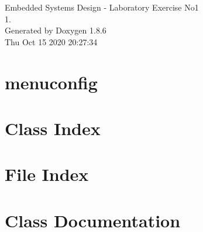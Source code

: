 \documentclass[twoside]{book}
\newcommand{\clearemptydoublepage}{%
  \newpage{\pagestyle{empty}\cleardoublepage}%
}
\begin{document}
\hypersetup{pageanchor=false}
\begin{titlepage}
\vspace*{7cm}
\begin{center}%
{\Large Embedded Systems Design -\/ Laboratory Exercise No1 \\[1ex]\large 1. }\\
\vspace*{1cm}
{\large Generated by Doxygen 1.8.6}\\
\vspace*{0.5cm}
{\small Thu Oct 15 2020 20:27:34}\\
\end{center}
\end{titlepage}
\clearemptydoublepage
\tableofcontents
\clearemptydoublepage
{}
\hypersetup{pageanchor=true}

\chapter{menuconfig}
\label{md_menuconfig_README}
\hypertarget{md_menuconfig_README}{}

\chapter{Class Index}

\chapter{File Index}

\chapter{Class Documentation}


























\end{document}
